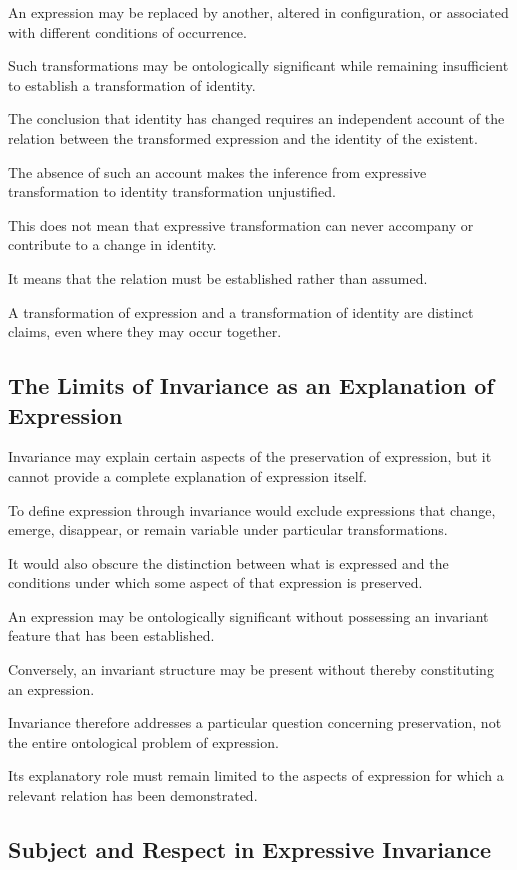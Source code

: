 An expression may be replaced by another,
altered in configuration, or associated with
different conditions of occurrence.

Such transformations may be ontologically
significant while remaining insufficient to
establish a transformation of identity.

The conclusion that identity has changed requires
an independent account of the relation between
the transformed expression and the identity
of the existent.

The absence of such an account makes the inference
from expressive transformation to identity
transformation unjustified.

This does not mean that expressive transformation
can never accompany or contribute to a change
in identity.

It means that the relation must be established
rather than assumed.

A transformation of expression and a transformation
of identity are distinct claims, even where they
may occur together.

\subsection{The Limits of Invariance as an Explanation of Expression}

Invariance may explain certain aspects of the
preservation of expression, but it cannot provide
a complete explanation of expression itself.

To define expression through invariance would
exclude expressions that change, emerge, disappear,
or remain variable under particular transformations.

It would also obscure the distinction between
what is expressed and the conditions under which
some aspect of that expression is preserved.

An expression may be ontologically significant
without possessing an invariant feature that
has been established.

Conversely, an invariant structure may be present
without thereby constituting an expression.

Invariance therefore addresses a particular
question concerning preservation, not the entire
ontological problem of expression.

Its explanatory role must remain limited to
the aspects of expression for which a relevant
relation has been demonstrated.

\subsection{Subject and Respect in Expressive Invariance}

